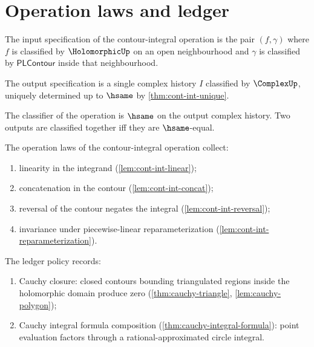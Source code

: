 \section{Operation laws and ledger}

\begin{definition}
\label{def:cont-int-input-spec}
The input specification of the contour-integral operation is the pair \((f, \gamma)\) where \(f\) is classified by \(\HolomorphicUp\) on an open neighbourhood and \(\gamma\) is classified by \(\mathsf{PLContour}\) inside that neighbourhood.
\end{definition}

\begin{definition}
\label{def:cont-int-output-spec}
The output specification is a single complex history \(I\) classified by \(\ComplexUp\), uniquely determined up to \(\hsame\) by \autoref{thm:cont-int-unique}.
\end{definition}

\begin{definition}
\label{def:cont-int-classifier}
The classifier of the operation is \(\hsame\) on the output complex history. Two outputs are classified together iff they are \(\hsame\)-equal.
\end{definition}

\begin{definition}
\label{def:cont-int-operation-laws}
The operation laws of the contour-integral operation collect:
\begin{enumerate}
  \item linearity in the integrand (\autoref{lem:cont-int-linear});
  \item concatenation in the contour (\autoref{lem:cont-int-concat});
  \item reversal of the contour negates the integral (\autoref{lem:cont-int-reversal});
  \item invariance under piecewise-linear reparameterization (\autoref{lem:cont-int-reparameterization}).
\end{enumerate}
\end{definition}

\begin{definition}
\label{def:cont-int-ledger-policy}
The ledger policy records:
\begin{enumerate}
  \item Cauchy closure: closed contours bounding triangulated regions inside the holomorphic domain produce zero (\autoref{thm:cauchy-triangle}, \autoref{lem:cauchy-polygon});
  \item Cauchy integral formula composition (\autoref{thm:cauchy-integral-formula}): point evaluation factors through a rational-approximated circle integral.
\end{enumerate}
\end{definition}

